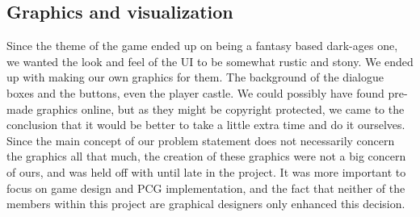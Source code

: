 \subsection{Graphics and visualization}
Since the theme of the game ended up on being a fantasy based dark-ages one, we wanted the look and feel of the UI to be somewhat rustic and stony. We ended up with making our own graphics for them. The background of the dialogue boxes and the buttons, even the player castle. We could possibly have found pre-made graphics online, but as they might be copyright protected, we came to the conclusion that it would be better to take a little extra time and do it ourselves. Since the main concept of our problem statement does not necessarily concern the graphics all that much, the creation of these graphics were not a big concern of ours, and was held off with until late in the project. It was more important to focus on game design and PCG implementation, and the fact that neither of the members within this project are graphical designers only enhanced this decision.



